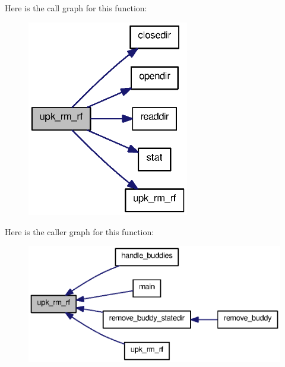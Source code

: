 Here is the call graph for this function:
\nopagebreak
\begin{figure}[H]
\begin{center}
\leavevmode
\includegraphics[width=200pt]{upk__util_8c_ab9358b45d3e4e93d49e080a04a414b1a_cgraph}
\end{center}
\end{figure}




Here is the caller graph for this function:
\nopagebreak
\begin{figure}[H]
\begin{center}
\leavevmode
\includegraphics[width=374pt]{upk__util_8c_ab9358b45d3e4e93d49e080a04a414b1a_icgraph}
\end{center}
\end{figure}


